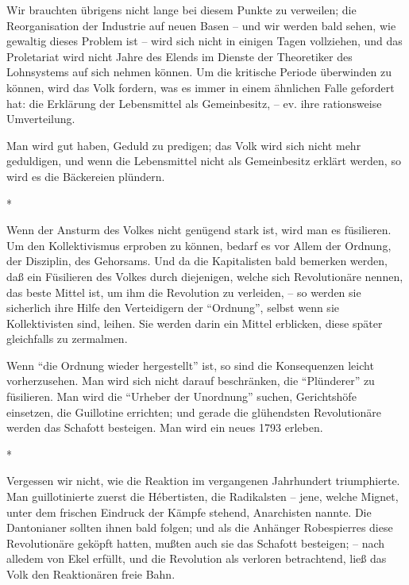 \documentclass{scrbook}
\begin{document}
Wir brauchten übrigens nicht lange bei diesem Punkte zu verweilen; die Reorganisation der Industrie auf neuen Basen – und wir werden bald sehen, wie gewaltig dieses Problem ist – wird sich nicht in einigen Tagen vollziehen, und das Proletariat wird nicht Jahre des Elends im Dienste der Theoretiker des Lohnsystems auf sich nehmen können. Um die kritische Periode überwinden zu können, wird das Volk fordern, was es immer in einem ähnlichen Falle gefordert hat: die Erklärung der Lebensmittel als Gemeinbesitz, – ev. ihre rationsweise Umverteilung.

Man wird gut haben, Geduld zu predigen; das Volk wird sich nicht mehr geduldigen, und wenn die Lebensmittel nicht als Gemeinbesitz erklärt werden, so wird es die Bäckereien plündern.

\begin{center}*\end{center}

Wenn der Ansturm des Volkes nicht genügend stark ist, wird man es füsilieren. Um den Kollektivismus erproben zu können, bedarf es vor Allem der Ordnung, der Disziplin, des Gehorsams. Und da die Kapitalisten bald bemerken werden, daß ein Füsilieren des Volkes durch diejenigen, welche sich Revolutionäre nennen, das beste Mittel ist, um ihm die Revolution zu verleiden, – so werden sie sicherlich ihre Hilfe den Verteidigern der ``Ordnung'', selbst wenn sie Kollektivisten sind, leihen. Sie werden darin ein Mittel erblicken, diese später gleichfalls zu zermalmen.

Wenn ``die Ordnung wieder hergestellt'' ist, so sind die Konsequenzen leicht vorherzusehen. Man wird sich nicht darauf beschränken, die ``Plünderer'' zu füsilieren. Man wird die ``Urheber der Unordnung'' suchen, Gerichtshöfe einsetzen, die Guillotine errichten; und gerade die glühendsten Revolutionäre werden das Schafott besteigen. Man wird ein neues 1793 erleben.

\begin{center}*\end{center}

Vergessen wir nicht, wie die Reaktion im vergangenen Jahrhundert triumphierte. Man guillotinierte zuerst die Hébertisten, die Radikalsten – jene, welche Mignet, unter dem frischen Eindruck der Kämpfe stehend, Anarchisten nannte. Die Dantonianer sollten ihnen bald folgen; und als die Anhänger Robespierres diese Revolutionäre geköpft hatten, mußten auch sie das Schafott besteigen; – nach alledem von Ekel erfüllt, und die Revolution als verloren betrachtend, ließ das Volk den Reaktionären freie Bahn.
\end{document}
